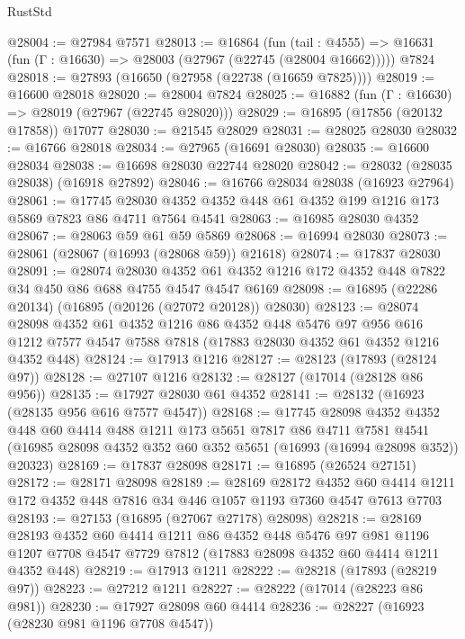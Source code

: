\begin{lexlean}{RustStd}
\begin{coremodule}
@28004 := @27984 @7571
@28013 := @16864
    (fun (tail : @4555) => @16631 (fun (Γ : @16630) => @28003 (@27967 (@22745 (@28004 @16662)))))
    @7824
@28018 := @27893 (@16650 (@27958 (@22738 (@16659 @7825))))
@28019 := @16600 @28018
@28020 := @28004 @7824
@28025 := @16882 (fun (Γ : @16630) => @28019 (@27967 (@22745 @28020)))
@28029 := @16895 (@17856 (@20132 @17858)) @17077
@28030 := @21545 @28029
@28031 := @28025 @28030
@28032 := @16766 @28018
@28034 := @27965 (@16691 @28030)
@28035 := @16600 @28034
@28038 := @16698 @28030 @22744 @28020
@28042 := @28032 (@28035 @28038) (@16918 @27892)
@28046 := @16766 @28034 @28038 (@16923 @27964)
@28061 := @17745 @28030 @4352 @4352 @448 @61 @4352 @199 @1216 @173 @5869 @7823 @86 @4711 @7564 @4541
@28063 := @16985 @28030 @4352
@28067 := @28063 @59 @61 @59 @5869
@28068 := @16994 @28030
@28073 := @28061 (@28067 (@16993 (@28068 @59)) @21618)
@28074 := @17837 @28030
@28091 := @28074
    @28030
    @4352
    @61
    @4352
    @1216
    @172
    @4352
    @448
    @7822
    @34
    @450
    @86
    @688
    @4755
    @4547
    @4547
    @6169
@28098 := @16895 (@22286 @20134) (@16895 (@20126 (@27072 @20128)) @28030)
@28123 := @28074
    @28098
    @4352
    @61
    @4352
    @1216
    @86
    @4352
    @448
    @5476
    @97
    @956
    @616
    @1212
    @7577
    @4547
    @7588
    @7818
    (@17883 @28030 @4352 @61 @4352 @1216 @4352 @448)
@28124 := @17913 @1216
@28127 := @28123 (@17893 (@28124 @97))
@28128 := @27107 @1216
@28132 := @28127 (@17014 (@28128 @86 @956))
@28135 := @17927 @28030 @61 @4352
@28141 := @28132 (@16923 (@28135 @956 @616 @7577 @4547))
@28168 := @17745
    @28098
    @4352
    @4352
    @448
    @60
    @4414
    @488
    @1211
    @173
    @5651
    @7817
    @86
    @4711
    @7581
    @4541
    (@16985 @28098 @4352 @352 @60 @352 @5651 (@16993 (@16994 @28098 @352)) @20323)
@28169 := @17837 @28098
@28171 := @16895 (@26524 @27151)
@28172 := @28171 @28098
@28189 := @28169
    @28172
    @4352
    @60
    @4414
    @1211
    @172
    @4352
    @448
    @7816
    @34
    @446
    @1057
    @1193
    @7360
    @4547
    @7613
    @7703
@28193 := @27153 (@16895 (@27067 @27178) @28098)
@28218 := @28169
    @28193
    @4352
    @60
    @4414
    @1211
    @86
    @4352
    @448
    @5476
    @97
    @981
    @1196
    @1207
    @7708
    @4547
    @7729
    @7812
    (@17883 @28098 @4352 @60 @4414 @1211 @4352 @448)
@28219 := @17913 @1211
@28222 := @28218 (@17893 (@28219 @97))
@28223 := @27212 @1211
@28227 := @28222 (@17014 (@28223 @86 @981))
@28230 := @17927 @28098 @60 @4414
@28236 := @28227 (@16923 (@28230 @981 @1196 @7708 @4547))

\end{coremodule}
\end{lexlean}
